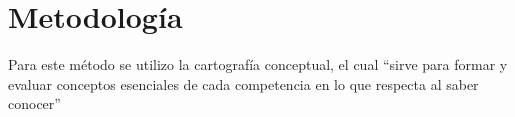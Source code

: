 \section{Metodología}
Para este método se utilizo la cartografía conceptual, el cual “sirve para formar y evaluar conceptos esenciales de cada competencia en lo que respecta al saber conocer” \parencite[][p. 16]{tobon2012} 

%
%

